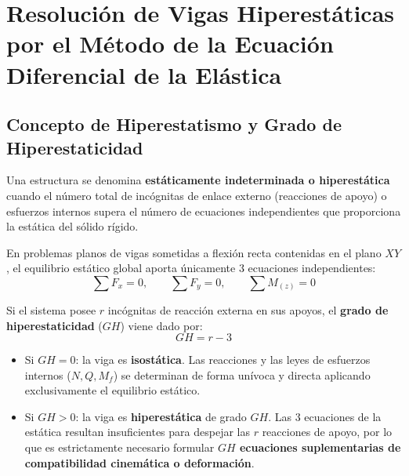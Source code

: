 \section{Resolución de Vigas Hiperestáticas por el Método de la Ecuación Diferencial de la Elástica}

\subsection{Concepto de Hiperestatismo y Grado de Hiperestaticidad}

Una estructura se denomina \textbf{estáticamente indeterminada o hiperestática} cuando el número total de incógnitas de enlace externo (reacciones de apoyo) o esfuerzos internos supera el número de ecuaciones independientes que proporciona la estática del sólido rígido.

En problemas planos de vigas sometidas a flexión recta contenidas en el plano $XY$, el equilibrio estático global aporta únicamente $3$ ecuaciones independientes:
\begin{equation}
    \sum F_x = 0, \qquad \sum F_y = 0, \qquad \sum M_{(z)} = 0
\end{equation}

Si el sistema posee $r$ incógnitas de reacción externa en sus apoyos, el \textbf{grado de hiperestaticidad} ($GH$) viene dado por:
\begin{equation}
    GH = r - 3
\end{equation}

\begin{itemize}
    \item Si $GH = 0$: la viga es \textbf{isostática}. Las reacciones y las leyes de esfuerzos internos ($N, Q, M_f$) se determinan de forma unívoca y directa aplicando exclusivamente el equilibrio estático.
    \item Si $GH > 0$: la viga es \textbf{hiperestática} de grado $GH$. Las 3 ecuaciones de la estática resultan insuficientes para despejar las $r$ reacciones de apoyo, por lo que es estrictamente necesario formular \textbf{$GH$ ecuaciones suplementarias de compatibilidad cinemática o deformación}.
\end{itemize}


